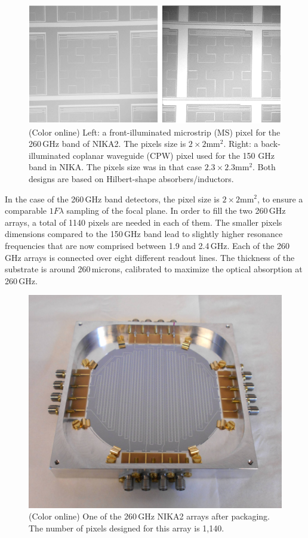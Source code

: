 \documentclass[]{aa} %
\begin{document}
\begin{figure}[h]
   \centering
    \includegraphics[width=.95\linewidth]{CPWeMS.png}
      \caption{(Color online) Left: a front-illuminated microstrip (MS) pixel for the 260\,GHz band of NIKA2. The pixels size is $2\times2\textrm{mm}^2$. Right: a back-illuminated coplanar waveguide (CPW) pixel used for the 150 GHz band in NIKA. The pixels size was in that case $2.3\times2.3\textrm{mm}^2$. Both designs are based on Hilbert-shape absorbers/inductors.}
         \label{Pixels}
\end{figure}

In the case of the 260\,GHz band detectors, the pixel size is $2\times 2\mathrm{mm}^2$, to ensure a comparable $1 F \lambda$ sampling of the focal plane. In order to fill the two 260\,GHz arrays, a total of 1140 pixels are needed in each of them. The smaller pixels dimensions compared to the 150\,GHz band lead to slightly higher resonance frequencies that are now comprised between 1.9 and 2.4\,GHz. Each of the 260\,GHz arrays is connected over eight different readout lines.  The thickness of the substrate is around 260\,microns, calibrated to maximize the optical absorption at 260\,GHz. 

\begin{figure}[h]
   \centering
    \includegraphics[width=.95\linewidth]{1mm_array.jpg}
      \caption{(Color online) One of the 260\,GHz NIKA2 arrays after packaging. The number of pixels designed for this array is 1,140.}
         \label{Array}
\end{figure}
\end{document}
